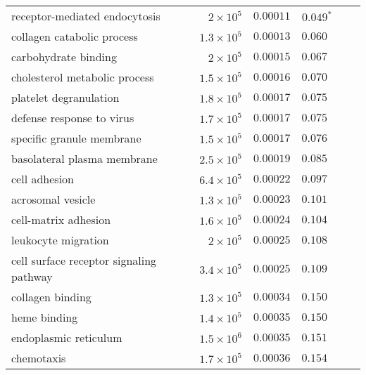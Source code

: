 \begin{longtable}{|l|r|r|r|r|r|}
            receptor-mediated endocytosis &  $ 2\times 10^{5}$ &            $0.00011$ &              $\bm{ 0.049{^*}}$ \\
               collagen catabolic process & $1.3\times 10^{5}$ &            $0.00013$ &                     $ 0.060~~$ \\
                     carbohydrate binding &  $ 2\times 10^{5}$ &            $0.00015$ &                     $ 0.067~~$ \\
            cholesterol metabolic process & $1.5\times 10^{5}$ &            $0.00016$ &                     $ 0.070~~$ \\
                   platelet degranulation & $1.8\times 10^{5}$ &            $0.00017$ &                     $ 0.075~~$ \\
                defense response to virus & $1.7\times 10^{5}$ &            $0.00017$ &                     $ 0.075~~$ \\
                specific granule membrane & $1.5\times 10^{5}$ &            $0.00017$ &                     $ 0.076~~$ \\
              basolateral plasma membrane & $2.5\times 10^{5}$ &            $0.00019$ &                     $ 0.085~~$ \\
                            cell adhesion & $6.4\times 10^{5}$ &            $0.00022$ &                     $ 0.097~~$ \\
                        acrosomal vesicle & $1.3\times 10^{5}$ &            $0.00023$ &                     $ 0.101~~$ \\
                     cell-matrix adhesion & $1.6\times 10^{5}$ &            $0.00024$ &                     $ 0.104~~$ \\
                      leukocyte migration &  $ 2\times 10^{5}$ &            $0.00025$ &                     $ 0.108~~$ \\
  cell surface receptor signaling pathway & $3.4\times 10^{5}$ &            $0.00025$ &                     $ 0.109~~$ \\
                         collagen binding & $1.3\times 10^{5}$ &            $0.00034$ &                     $ 0.150~~$ \\
                             heme binding & $1.4\times 10^{5}$ &            $0.00035$ &                     $ 0.150~~$ \\
                    endoplasmic reticulum & $1.5\times 10^{6}$ &            $0.00035$ &                     $ 0.151~~$ \\
                               chemotaxis & $1.7\times 10^{5}$ &            $0.00036$ &                     $ 0.154~~$ \\

\end{longtable}
